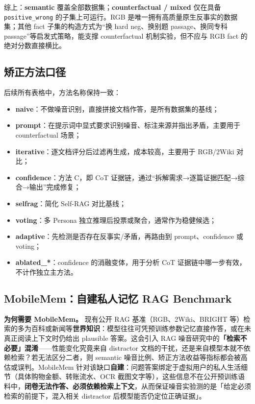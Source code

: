 \documentclass[UTF8,zihao=-4]{ctexart}
\begin{document}
综上：\textbf{semantic} 覆盖全部数据集；\textbf{counterfactual / mixed} 仅在具备 \texttt{positive\_wrong} 的子集上可运行。RGB 是唯一拥有高质量原生反事实的数据集；其他 fact 子集的构造方式为“换 hard neg、换别题 passage、换同专科 passage”等启发式策略，能支撑 counterfactual 机制实验，但不应与 RGB fact 的绝对分数直接横比。

\subsection{矫正方法口径}

后续所有表格中，方法名称保持一致：
\begin{itemize}
  \item \textbf{naive}：不做噪音识别，直接拼接文档作答，是所有数据集的基线；
  \item \textbf{prompt}：在提示词中显式要求识别噪音、标注来源并指出矛盾，主要用于 counterfactual 场景；
  \item \textbf{iterative}：逐文档评分后过滤再生成，成本较高，主要用于 RGB/2Wiki 对比；
  \item \textbf{confidence}：方法 C，即 CoT 证据链，通过“拆解需求→逐篇证据匹配→综合→输出”完成修复；
  \item \textbf{selfrag}：简化 Self-RAG 对比基线；
  \item \textbf{voting}：多 Persona 独立推理后投票或聚合，通常作为稳健候选；
  \item \textbf{adaptive}：先检测是否存在反事实/矛盾，再路由到 prompt、confidence 或 voting；
  \item \textbf{ablated\_*}：confidence 的消融变体，用于分析 CoT 证据链中哪一步有效，不计作独立主方法。
\end{itemize}

\subsection{MobileMem：自建私人记忆 RAG Benchmark}
\label{sec:mobilemem}

\textbf{为何需要 MobileMem。} 现有公开 RAG 基准（RGB、2Wiki、BRIGHT 等）检索的多为百科或新闻等\textbf{世界知识}：模型往往可凭预训练参数记忆直接作答，或在未真正阅读上下文时仍给出 plausible 答案。这会引入 RAG 噪音研究中的\textbf{「检索不必要」混淆}——性能变化究竟来自 distractor 文档的干扰，还是来自模型本就不依赖检索？若无法区分二者，则 semantic 噪音比例、矫正方法收益等指标都会被高估或误判。MobileMem 针对该缺口\textbf{自建}：问题答案绑定于虚拟用户的私人生活细节（具体购物金额、转账流水、OCR 截图文字等），这些信息不在公开预训练语料中，\textbf{闭卷无法作答、必须依赖检索上下文}，从而保证噪音实验测的是「给定必须检索的前提下，混入相关 distractor 后模型能否仍定位正确证据」。
\end{document}
